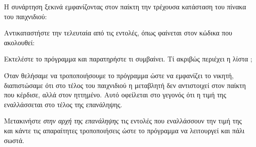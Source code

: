 \documentclass[a4paper,11pt,oneside]{book}
\begin{document}

\begin{exercise}
Η συνάρτηση  ξεκινά εμφανίζοντας στον παίκτη την τρέχουσα κατάσταση του πίνακα του παιχνιδιού:


Αντικαταστήστε την τελευταία από τις εντολές, όπως φαίνεται στον κώδικα που ακολουθεί:


Εκτελέστε το πρόγραμμα και παρατηρήστε τι συμβαίνει. Τί ακριβώς περιέχει η λίστα ;
\end{exercise}

\begin{exercise}
Όταν θελήσαμε να τροποποιήσουμε το πρόγραμμα ώστε να εμφανίζει το νικητή, διαπιστώσαμε ότι στο τέλος του παιχνιδιού η μεταβλητή  δεν αντιστοιχεί στον παίκτη που κέρδισε, αλλά στον ηττημένο. Αυτό οφείλεται στο γεγονός ότι η τιμή της  εναλλάσσεται στο τέλος της επανάληψης. 

Μετακινήστε \emph{στην αρχή της επανάληψης} τις εντολές που εναλλάσσουν την τιμή της  και κάντε τις απαραίτητες τροποποιήσεις ώστε το πρόγραμμα να λειτουργεί και πάλι σωστά.
\end{exercise}
\end{document}
